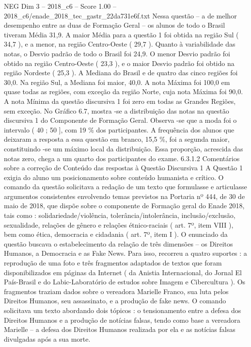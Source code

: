 \begin{textsample}{NEG Dim 3 – 2018\_c6 – Score 1.00 – 2018\_c6/enade\_2018\_tec\_gastr\_22da731e6f.txt}
Nessa questão – a de melhor desempenho entre as duas de Formação Geral – os alunos de todo o Brasil tiveram Média 31,9.
A maior Média para a questão 1 foi obtida na região Sul ( 34,7 ), e a menor, na região Centro-Oeste ( 29,7 ).
Quanto à variabilidade das notas, o Desvio padrão de todo o Brasil foi 24,9.
O menor Desvio padrão foi obtido na região Centro-Oeste ( 23,3 ), e o maior Desvio padrão foi obtido na região Nordeste ( 25,3 ).
A Mediana do Brasil e de quatro das cinco regiões foi 30,0.
Na região Sul, a Mediana foi maior, 40,0.
A nota Máxima foi 100,0 em quase todas as regiões, com exceção da região Norte, cuja nota Máxima foi 90,0.
A nota Mínima da questão discursiva 1 foi zero em todas as Grandes Regiões, sem exceção.
No Gráfico 6.7, mostra -se a distribuição das notas na questão discursiva 1 do Componente de Formação Geral.
Observa -se que a moda foi o intervalo ( 40 ; 50 ], com 19 \% dos participantes.
A frequência dos alunos que deixaram a resposta a essa questão em branco, 15,5 \%, foi a segunda maior, constituindo -se um máximo local da distribuição.
Essa proporção, acrescida das notas zero, chega a um quarto dos participantes do exame. 6.3.1.2 Comentários sobre a correção de Conteúdo das respostas à Questão Discursiva 1 A Questão 1 exigia do aluno um posicionamento sobre conteúdo humanista e crítico.
O comando da questão solicitava a redação de um texto que formulasse e articulasse argumentos consistentes envolvendo temas previstos na Portaria nº 444, de 30 de maio de 2018, que dispõe sobre o componente de Formação geral do Enade 2018, tais como : solidariedade/violência, tolerância/intolerância, inclusão/exclusão, sexualidade, relações de gênero e relações étnico-raciais ( art. 7º, item VIII ), bem como ética, democracia e cidadania ( art. 7º, item I ).
O enunciado da questão buscava o estabelecimento da relação de três dimensões – os Direitos Humanos, a Democracia e as Fake News.
Para isso, recorreu a quatro suportes : a reprodução de uma foto e três fragmentos adaptados de textos que foram disponibilizados em páginas da Internet ( da Anistia Internacional, do Jornal El País-Brasil e do Labic-Laboratório de estudos sobre Imagem e Cibercultura ).
Os fragmentos traziam dados sobre o vereadora Marielle Franco, sua luta pelos Direitos Humanos, seu assassinato, e a produção de fake news.
O comando solicitava um texto abordando dois tópicos : o tensionamento entre a defesa dos Direitos Humanos e a produção de notícias falsas, tendo como base a vereadora Marielle – a defesa dos Direitos Humanos realizada por ela e as notícias falsas divulgadas após a sua morte.

\end{textsample}
